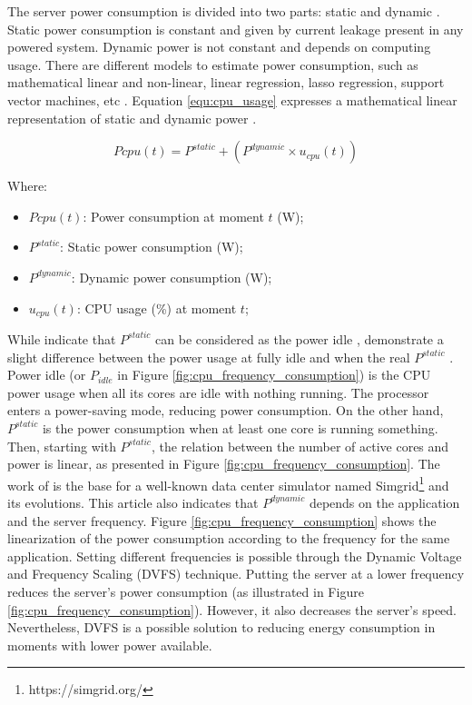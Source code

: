 The server power consumption is divided into two parts: static and dynamic \cite{orgerie2014survey, heinrich2017predicting}. Static power consumption is constant and given by current leakage present in any powered system. Dynamic power is not constant and depends on computing usage. There are different models to estimate power consumption, such as mathematical linear and non-linear, linear regression, lasso regression, support vector machines, etc \cite{ismail2020computing}. Equation \ref{equ:cpu_usage} expresses a mathematical linear representation of static and dynamic power \cite{heinrich2017predicting, ismail2020computing}.

\begin{equation}
    \label{equ:cpu_usage}
    Pcpu(t) = P^{static} + (P^{dynamic} \times u_{cpu}(t))
\end{equation}

Where:
\begin{itemize}
    \item $Pcpu(t)$: Power consumption at moment $t$ (W);
    \item $P^{static}$: Static power consumption (W);
    \item $P^{dynamic}$: Dynamic power consumption (W);
    \item $u_{cpu}(t)$: CPU usage (\%) at moment $t$;
\end{itemize}


While \citeauthor{ismail2020computing} indicate that $P^{static}$ can be considered as the power idle \cite{ismail2020computing}, \citeauthor{heinrich2017predicting} demonstrate a slight difference between the power usage at fully idle and when the real $P^{static}$ \cite{heinrich2017predicting}. Power idle (or $P_{idle}$ in Figure \ref{fig:cpu_frequency_consumption}) is the CPU power usage when all its cores are idle with nothing running. The processor enters a power-saving mode, reducing power consumption. On the other hand, $P^{static}$ is the power consumption when at least one core is running something. Then, starting with $P^{static}$, the relation between the number of active cores and power is linear, as presented in Figure \ref{fig:cpu_frequency_consumption}. The work of \citeauthor{heinrich2017predicting} is the base for a well-known data center simulator named Simgrid\footnote{https://simgrid.org/} and its evolutions. This article also indicates that $P^{dynamic}$ depends on the application and the server frequency. Figure \ref{fig:cpu_frequency_consumption} shows the linearization of the power consumption according to the frequency for the same application. Setting different frequencies is possible through the Dynamic Voltage and Frequency Scaling (DVFS) technique. Putting the server at a lower frequency reduces the server's power consumption (as illustrated in Figure \ref{fig:cpu_frequency_consumption}). However, it also decreases the server's speed. Nevertheless, DVFS is a possible solution to reducing energy consumption in moments with lower power available. 

